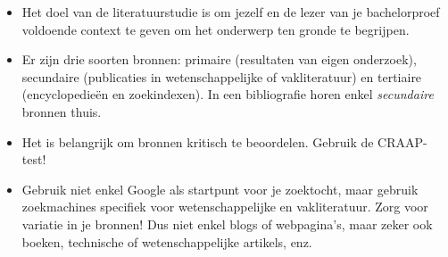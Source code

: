 \begin{itemize}
  \item Het doel van de literatuurstudie is om jezelf en de lezer van je bachelorproef voldoende context te geven om het onderwerp ten gronde te begrijpen.
  \item Er zijn drie soorten bronnen: primaire (resultaten van eigen onderzoek), secundaire (publicaties in wetenschappelijke of vakliteratuur) en tertiaire (encyclopedieën en zoekindexen). In een bibliografie horen enkel \emph{secundaire} bronnen thuis.
  \item Het is belangrijk om bronnen kritisch te beoordelen. Gebruik de CRAAP-test!
  \item Gebruik niet enkel Google als startpunt voor je zoektocht, maar gebruik zoekmachines specifiek voor wetenschappelijke en vakliteratuur. Zorg voor variatie in je bronnen! Dus niet enkel blogs of webpagina's, maar zeker ook boeken, technische of wetenschappelijke artikels, enz.
\end{itemize}







